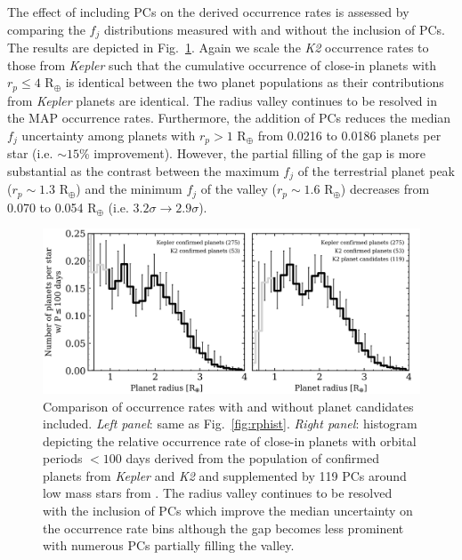 \documentclass[twocolumn]{emulateapj}
\newcommand{\kepler}[1]{\emph{Kepler}#1}
\newcommand{\ktwo}[1]{\emph{K2}#1}
\begin{document}


The effect of including PCs on the derived occurrence rates is assessed by comparing the $f_j$ distributions
measured with and without the inclusion of PCs. The results are depicted in
Fig.~\ref{fig:rphistPCs}. Again we scale the \ktwo{} occurrence rates
to those from \kepler{} such that the cumulative occurrence of close-in planets with $r_p \leq 4$ R$_{\oplus}$
is identical between the two planet populations as their contributions from \kepler{} planets are identical.
The radius valley continues to be resolved in
the MAP occurrence rates. Furthermore, the addition of PCs reduces the median $f_j$ uncertainty among planets
with $r_p>1$ R$_{\oplus}$ from
0.0216 to 0.0186 planets per star (i.e. $\sim 15$\% improvement). However, the partial filling of the gap is
more substantial as the contrast between the maximum $f_j$ of the terrestrial planet peak ($r_p \sim 1.3$ R$_{\oplus}$)
and the minimum $f_j$ of the valley ($r_p \sim 1.6$ R$_{\oplus}$) decreases from 0.070
to 0.054 R$_{\oplus}$ (i.e. $3.2\sigma \to 2.9\sigma$).

\begin{figure}
  \centering
  \includegraphics[scale=.8]{figures/rphist_kruse.png}
  \caption{Comparison of occurrence rates with and without planet candidates included. \emph{Left panel}:
    same as Fig.~\ref{fig:rphist}. \emph{Right panel}: histogram depicting the relative occurrence
    rate of close-in planets with orbital periods $<100$ days derived from the population of confirmed
    planets from \kepler{} and \ktwo{} and supplemented by 119 PCs
    around low mass stars from \cite{kruse19}. The radius valley continues to be resolved with
    the inclusion of PCs which improve the median uncertainty on the occurrence rate bins although the
    gap becomes less prominent with numerous PCs partially filling the valley.}
  \label{fig:rphistPCs}
\end{figure}
\end{document}
